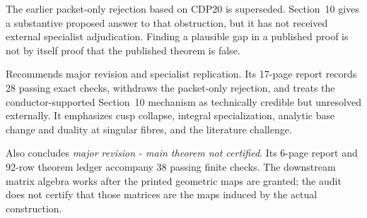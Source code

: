 \vspace{4pt}
{\fontsize{8.15pt}{9.55pt}\selectfont
The earlier packet-only rejection based on CDP20 is superseded. Section~10 gives a substantive proposed answer to that obstruction, but it has not received external specialist adjudication. Finding a plausible gap in a published proof is not by itself proof that the published theorem is false.

\noindent\begin{minipage}[t]{0.485\textwidth}
\vspace{0pt}
Recommends major revision and specialist replication. Its 17-page report records 28 passing exact checks, withdraws the packet-only rejection, and treats the conductor-supported Section~10 mechanism as technically credible but unresolved externally. It emphasizes cusp collapse, integral specialization, analytic base change and duality at singular fibres, and the literature challenge.
\end{minipage}\hfill
\begin{minipage}[t]{0.485\textwidth}
\vspace{0pt}
Also concludes \textit{major revision - main theorem not certified}. Its 6-page report and 92-row theorem ledger accompany 38 passing finite checks. The downstream matrix algebra works after the printed geometric maps are granted; the audit does not certify that those matrices are the maps induced by the actual construction.
\end{minipage}

}
